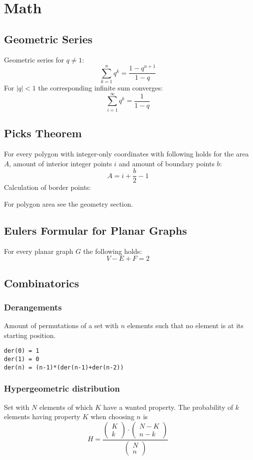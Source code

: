 \section{Math}

\subsection{Geometric Series}
Geometric series for $q \neq 1$:
\[
\sum\limits_{k=1}^n q^k = \frac{1-q^{n+1}}{1-q}
\]
For $\lvert q \rvert < 1$ the corresponding infinite sum converges:
\[
\sum_{i = 1}^{\infty} q^k = \frac{1}{1 - q}
\]

\subsection{Picks Theorem}
For every polygon with integer-only coordinates with following holds for the area $A$, amount of interior integer points $i$ and amount of boundary points $b$:
\[
A = i + \frac{b}{2} - 1
\]
Calculation of border points:

For polygon area see the geometry section.

\subsection{Eulers Formular for Planar Graphs}
For every planar graph $G$ the following holds:
\[
V - E + F = 2
\]

\subsection{Combinatorics}
\subsubsection{Derangements}
Amount of permutations of a set with $n$ elements such that no element is at its starting position.
\begin{lstlisting} 
der(0) = 1
der(1) = 0
der(n) = (n-1)*(der(n-1)+der(n-2))
\end{lstlisting}
\subsubsection{Hypergeometric distribution}
Set with $N$ elements of which $K$ have a wanted property. The probability of $k$ elements having property $K$ when choosing $n$ is
\[
H = \frac{
	\left(\begin{array}{c}K\\k\end{array}\right)
	\cdot 
	\left(\begin{array}{c}N-K\\n-k\end{array}\right)
}
{
	\left(\begin{array}{c}N\\n\end{array}\right)
}
\]
